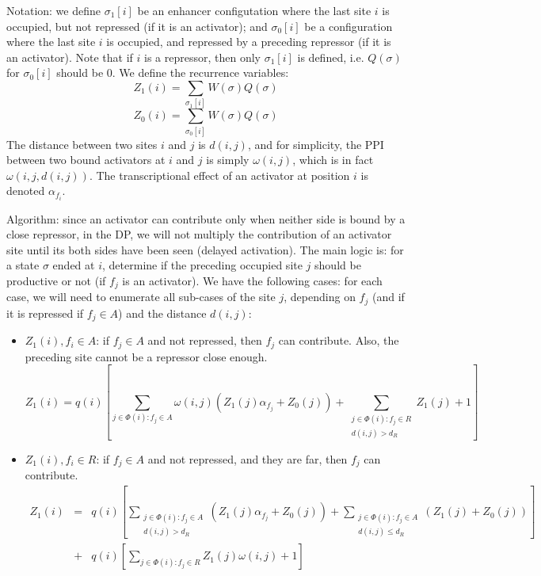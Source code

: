 \documentclass[11pt]{article}
\begin{document}
\begin{enumerate}
\begin{enumerate}
Notation: we define $\sigma_1[i]$ be an enhancer configutation where the last site $i$ is occupied, but not repressed (if it is an activator); and $\sigma_0[i]$ be a configuration where the last site $i$ is occupied, and repressed by a preceding repressor (if it is an activator). Note that if $i$ is a repressor, then only $\sigma_1[i]$ is defined, i.e. $Q(\sigma)$ for $\sigma_0[i]$ should be 0. We define the recurrence variables: 
\begin{equation}
Z_1(i) = \sum_{\sigma_1[i]} W(\sigma) Q(\sigma)
\end{equation}
\begin{equation}
Z_0(i) = \sum_{\sigma_0[i]} W(\sigma) Q(\sigma)
\end{equation}
The distance between two sites $i$ and $j$ is $d(i,j)$, and for simplicity, the PPI between two bound activators at $i$ and $j$ is simply $\omega(i,j)$, which is in fact $\omega(i,j,d(i,j))$. The transcriptional effect of an activator at position $i$ is denoted $\alpha_{f_i}$. 

Algorithm: since an activator can contribute only when neither side is bound by a close repressor, in the DP, we will not multiply the contribution of an activator site until its both sides have been seen (delayed activation). The main logic is: for a state $\sigma$ ended at $i$, determine if the preceding occupied site $j$ should be productive or not (if $f_j$ is an activator). We have the following cases: for each case, we will need to enumerate all sub-cases of the site $j$, depending on $f_j$ (and if it is repressed if $f_j \in A$) and the distance $d(i,j)$: 
\begin{itemize}
\item $Z_1(i), f_i \in A$: if $f_j \in A$ and not repressed, then $f_j$ can contribute. Also, the preceding site cannot be a repressor close enough. 
\begin{equation}
Z_1(i) = q(i) \left[ \sum_{j \in \Phi (i):f_j \in A} \omega(i,j) \left(Z_1(j) \alpha_{f_j}  + Z_0(j)\right) + \sum_{\substack{j \in \Phi (i):f_j \in R\\ d(i,j) > d_R}} Z_1(j) + 1\right]
\end{equation}

\item $Z_1(i), f_i \in R$: if $f_j \in A$ and not repressed, and they are far, then $f_j$ can contribute. 
\begin{equation}
\begin{array}{lll}
Z_1(i) & = & q(i) \left[ \sum_{\substack{j \in \Phi (i):f_j \in A\\ d(i,j) > d_R}} (Z_1(j) \alpha_{f_j} + Z_0(j)) + \sum_{\substack{j\in \Phi (i) :f_j \in A\\ d(i,j) \leq d_R}} (Z_1(j) + Z_0(j)) \right]\\
 & + & q(i) \left[ \sum_{j \in \Phi (i):f_j \in R} Z_1(j) \omega(i,j) + 1 \right]\\
\end{array}
\end{equation}


\end{itemize}
\end{enumerate}
\end{enumerate}
\end{document}
